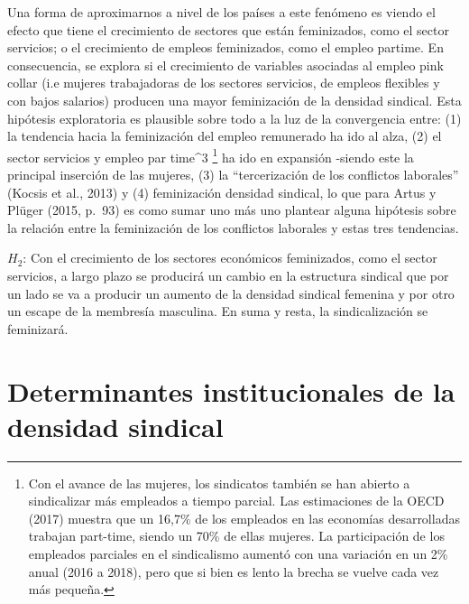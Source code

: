 \documentclass[
]{book}
\begin{document}
Una forma de aproximarnos a nivel de los países a este fenómeno es viendo el efecto que tiene el crecimiento de sectores que están feminizados, como el sector servicios; o el crecimiento de empleos feminizados, como el empleo partime. En consecuencia, se explora si el crecimiento de variables asociadas al empleo pink collar (i.e mujeres trabajadoras de los sectores servicios, de empleos flexibles y con bajos salarios) producen una mayor feminización de la densidad sindical. Esta hipótesis exploratoria es plausible sobre todo a la luz de la convergencia entre: (1) la tendencia hacia la feminización del empleo remunerado ha ido al alza, (2) el sector servicios y empleo par time\^{}3 \footnote{Con el avance de las mujeres, los sindicatos también se han abierto a sindicalizar más empleados a tiempo parcial. Las estimaciones de la OECD (2017) muestra que un 16,7\% de los empleados en las economías desarrolladas trabajan part-time, siendo un 70\% de ellas mujeres. La participación de los empleados parciales en el sindicalismo aumentó con una variación en un 2\% anual (2016 a 2018), pero que si bien es lento la brecha se vuelve cada vez más pequeña.} ha ido en expansión -siendo este la principal inserción de las mujeres, (3) la ``tercerización de los conflictos laborales'' (Kocsis et al., 2013) y (4) feminización densidad sindical, lo que para Artus y Plüger (2015, p.~93) es como sumar uno más uno plantear alguna hipótesis sobre la relación entre la feminización de los conflictos laborales y estas tres tendencias.

\(H_{2}\): Con el crecimiento de los sectores económicos feminizados, como el sector servicios, a largo plazo se producirá un cambio en la estructura sindical que por un lado se va a producir un aumento de la densidad sindical femenina y por otro un escape de la membresía masculina. En suma y resta, la sindicalización se feminizará.

\hypertarget{determinantes-institucionales-de-la-densidad-sindical}{%
\section{Determinantes institucionales de la densidad sindical}\label{determinantes-institucionales-de-la-densidad-sindical}}
\end{document}
